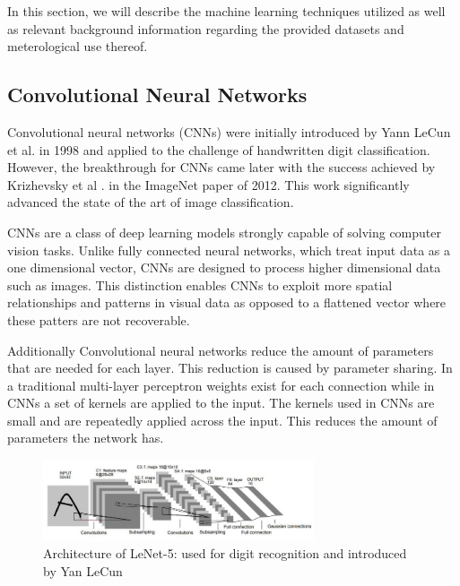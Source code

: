 In this section, we will describe the machine learning techniques utilized as well as relevant background information regarding the
provided datasets and meterological use thereof.
\smallskip

\subsection{Convolutional Neural Networks}

Convolutional neural networks (CNNs) were initially introduced by Yann LeCun et al. in 1998 \cite{lecun-1998} and applied to the challenge of handwritten digit classification. However, the breakthrough for CNNs came later with the success achieved by Krizhevsky et al \cite{krizhevsky-2017}. in the ImageNet paper of 2012.
This work significantly advanced the state of the art of image classification.
\smallskip

CNNs are a class of deep learning models strongly capable of solving computer vision tasks. Unlike fully connected neural networks, which treat input data as a one dimensional vector, CNNs are designed to process higher dimensional data such as images.
This distinction enables CNNs to exploit more spatial relationships and patterns in visual data as opposed to a flattened vector where these patters are not recoverable.
\smallskip

Additionally Convolutional neural networks reduce the amount of parameters that are needed for each layer. This reduction is caused by parameter sharing.
In a traditional multi-layer perceptron weights exist for each connection while in CNNs a set of kernels are applied to the input. The kernels used in CNNs are small and are repeatedly applied across the input.
This reduces the amount of parameters the network has. 

\begin{figure}
  \includegraphics[width=8cm]{../images/cun.jpeg}
  \caption[short]{Architecture of LeNet-5: used for digit recognition and introduced by Yan LeCun \cite{lecun-1998}}
\end{figure}

